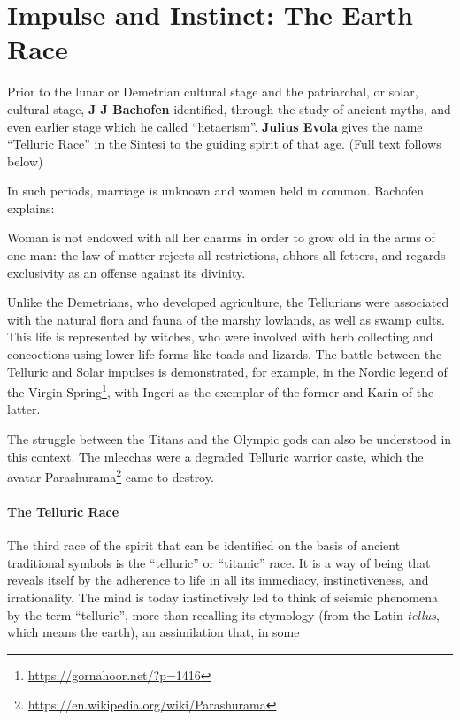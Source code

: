 \section{Impulse and Instinct: The Earth Race}

Prior to the lunar or Demetrian cultural stage and the patriarchal, or solar, cultural stage, \textbf{J J Bachofen} identified, through the study of ancient myths, and even earlier stage which he called ``hetaerism''. \textbf{Julius Evola} gives the name ``Telluric Race'' in the Sintesi to the guiding spirit of that age. (Full text follows below)

In such periods, marriage is unknown and women held in common. Bachofen explains:

\begin{quotex}
Woman is not endowed with all her charms in order to grow old in the arms of one man: the law of matter rejects all restrictions, abhors all fetters, and regards exclusivity as an offense against its divinity.
\end{quotex}


Unlike the Demetrians, who developed agriculture, the Tellurians were associated with the natural flora and fauna of the marshy lowlands, as well as swamp cults. This life is represented by witches, who were involved with herb collecting and concoctions using lower life forms like toads and lizards. The battle between the Telluric and Solar impulses is demonstrated, for example, in the Nordic legend of the Virgin Spring\footnote{\url{https://gornahoor.net/?p=1416}}, with Ingeri as the exemplar of the former and Karin of the latter.

The struggle between the Titans and the Olympic gods can also be understood in this context. The mlecchas were a degraded Telluric warrior caste, which the avatar Parashurama\footnote{\url{https://en.wikipedia.org/wiki/Parashurama}} came to destroy.

\paragraph{The Telluric Race}


The third race of the spirit that can be identified on the basis of ancient traditional symbols is the ``telluric'' or ``titanic'' race. It is a way of being that reveals itself by the adherence to life in all its immediacy, instinctiveness, and irrationality. The mind is today instinctively led to think of seismic phenomena by the term ``telluric'', more than recalling its etymology (from the Latin
\emph{tellus}, which means the earth), an assimilation that, in some

